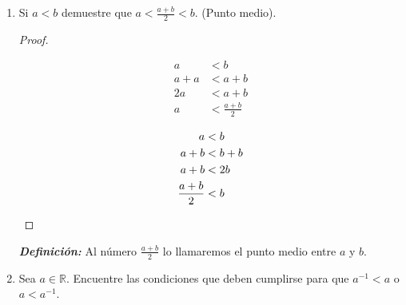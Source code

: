 \documentclass[11pt]{article}
\newcommand{\R}{\mathbb{R}}
\newcommand{\bfit}[1]{\textbf{\textit{#1}}}
\begin{document}
\begin{enumerate}[label=\alph*)]
        \item Si $a<b$ demuestre que $a<\frac{a+b}{2}<b$. (Punto medio).
        \vspace{-1em}\begin{proof} \leavevmode%
            \begin{center}\vspace{-2em}
            \begin{minipage}[r]{.4\linewidth}
            \begin{align*}
            a &< b \\
            a + a &< a+b \\
            2a &< a+b \\
            a &< \frac{a+b}{2}
            \end{align*}
            \end{minipage}%
            \begin{minipage}[l]{.4\linewidth}
            \begin{align*}
            a &< b \\
            a + b &< b+b \\
            a +b &< 2b \\
            \frac{a+b}{2} &< b \qedhere
            \end{align*}
            \end{minipage}%
            \end{center}%
        \end{proof} \vspace{-1em}
        \bfit{Definición:}  Al número $\frac{a+b}{2}$ lo llamaremos el punto medio entre $a$ y $b$.

    \item Sea $a\in \R$. Encuentre las condiciones que deben cumplirse para que $a^{-1}<a$ o $a<a^{-1}$.
    

\end{enumerate}
\end{document}
